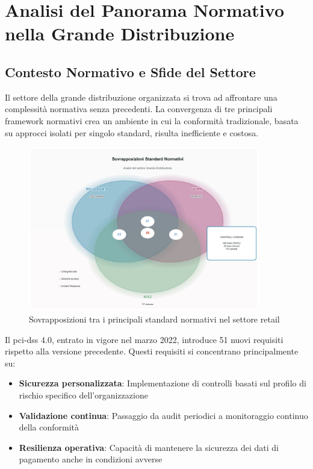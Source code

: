 \section{\texorpdfstring{Analisi del Panorama Normativo nella Grande Distribuzione}{4.2 - Analisi del Panorama Normativo nella Grande Distribuzione}}
\label{sec:4.2_panorama_normativo}

\subsection{\texorpdfstring{Contesto Normativo e Sfide del Settore}{4.2.1 - Contesto Normativo e Sfide del Settore}}
\label{subsec:4.2.1_contesto}

Il settore della grande distribuzione organizzata si trova ad affrontare una complessità normativa senza precedenti. La convergenza di tre principali framework normativi crea un ambiente in cui la conformità tradizionale, basata su approcci isolati per singolo standard, risulta inefficiente e costosa.

\begin{figure}[htbp]
\centering

\includegraphics[width=0.9\textwidth]{thesis_figures/cap4/figura_4_1_venn_premium.pdf}

\caption{Sovrapposizioni tra i principali standard normativi nel settore retail}
\label{fig:normative_overlap}
\end{figure}

Il \gls{pci-dss} 4.0, entrato in vigore nel marzo 2022, introduce 51 nuovi requisiti rispetto alla versione precedente\autocite{pcidss2024}. Questi requisiti si concentrano principalmente su:

\begin{itemize}
    \item \textbf{Sicurezza personalizzata}: Implementazione di controlli basati sul profilo di rischio specifico dell'organizzazione
    \item \textbf{Validazione continua}: Passaggio da audit periodici a monitoraggio continuo della conformità
    \item \textbf{Resilienza operativa}: Capacità di mantenere la sicurezza dei dati di pagamento anche in condizioni avverse
\end{itemize}

